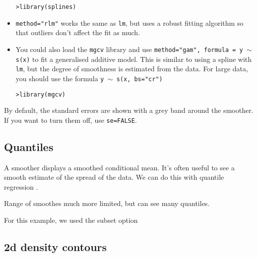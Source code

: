 \begin{itemize}
\begin{alltt}
> library(splines)
\end{alltt}

	\item {\tt method="rlm"} works the same as {\tt lm}, but uses a robust fitting algorithm so that outliers don't affect the fit as much.

	\item You could also load the {\tt mgcv} library and use {\tt method="gam", formula = y $\sim$ s(x)} to fit a generalised additive model.  This is similar 
to using a spline with {\tt lm}, but the degree of smoothness is estimated from the data.  For large data, you should use the formula {\tt y $\sim$ s(x, bs="cr")}
 
\begin{alltt}
> library(mgcv)
\end{alltt}

\end{itemize}

By default, the standard errors are shown with a grey band around the smoother.  If you want to turn them off, use {\tt se=FALSE}.

\subsection{Quantiles}\label{sub:quantiles}

A smoother displays a smoothed conditional mean.  It's often useful to see a smooth estimate of the spread of the data.  We can do this with quantile regression \citep{koenker:2005}.

Range of smoothes much more limited, but can see many quantiles.  

% 

For this example, we used the subset option

\subsection{2d density contours}


